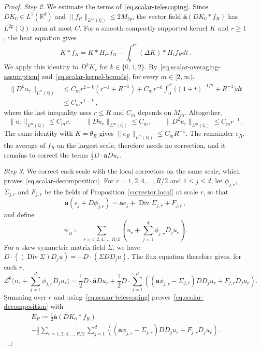 \documentclass[11pt]{amsart}
\theoremstyle{definition}
\theoremstyle{remark}
\numberwithin{equation}{section}
\newcommand{\Q}{\mathbb Q}
\newcommand{\R}{\mathbb R}
\renewcommand{\a}{\mathbf a}
\newcommand{\ahom}{\overline{\mathbf a}}
\newcommand{\Div}{\operatorname{Div}}
\begin{document}
\begin{proof}
\emph{Step 2.} We estimate the terms of~\eqref{eq.scalar-telescoping}. Since $DK_0\in L^1(\R^d)$ and $\|f_R\|_{L^{2p}(\Q)}\leq2M_{2p}$, the vector field $\ahom(DK_0*f_R)$ has $L^{2p}(\Q)$ norm at most $C$. For a smooth compactly supported kernel $K$ and $r\geq1$, the heat equation gives
\begin{equation}\label{eq.scalar-heat-transfer}
 K*f_R=K*H_{r^2}f_R-\int_0^{r^2}(\Delta K)*H_tf_Rdt\, .
\end{equation}
We apply this identity to $D^kK_r$ for $k\in\{0,1,2\}$. By~\eqref{eq.scalar-averaging-assumption} and~\eqref{eq.scalar-kernel-bounds}, for every $m\in[2,\infty)$,
\begin{align*}
 \|D^ku_r\|_{L^m(\Q)}
 &\leq C_mr^{2-k}(r^{-1}+R^{-1})
   +C_mr^{-k}\int_0^{r^2}\big((1+t)^{-1/2}+R^{-1}\big)dt\\
 &\leq C_mr^{1-k}\, ,
\end{align*}
where the last inequality uses $r\leq R$ and $C_m$ depends on $M_m$. Altogether,
\begin{equation}\label{eq.scalar-band-bounds}
 \|u_r\|_{L^m(\Q)}\leq C_mr,
 \qquad \|Du_r\|_{L^m(\Q)}\leq C_m,
 \qquad \|D^2u_r\|_{L^m(\Q)}\leq C_mr^{-1}\, .
\end{equation}
The same identity with $K=\theta_R$ gives $\|e_R\|_{L^m(\Q)}\leq C_mR^{-1}$. The remainder $e_R$, the average of $f_R$ on the largest scale, therefore needs no correction, and it remains to correct the terms $\frac12D\cdot\ahom Du_r$.

\emph{Step 3.} We correct each scale with the local correctors on the same scale, which proves~\eqref{eq.scalar-decomposition}. For $r=1,2,4,\ldots,R/2$ and $1\leq j\leq d$, let $\phi_{j,r}$, $\Sigma_{j,r}$ and $F_{j,r}$ be the fields of Proposition~\ref{corrector.local} at scale $r$, so that
\begin{equation*}
 \a(e_j+D\phi_{j,r})=\ahom e_j+\Div\Sigma_{j,r}+F_{j,r}\, ,
\end{equation*}
and define
\begin{equation}\label{eq.scalar-corrected-function}
 \psi_R\coloneqq\sum_{r=1,2,4,\ldots,R/2}
 \left(u_r+\sum_{j=1}^d\phi_{j,r}D_ju_r\right).
\end{equation}
For a skew-symmetric matrix field $\Sigma$, we have $D\cdot((\Div\Sigma)D_ju)=-D\cdot(\Sigma D D_ju)$. The flux equation therefore gives, for each $r$,
\begin{equation*}
 \mathcal L^0\Big(u_r+\sum_{j=1}^d\phi_{j,r}D_ju_r\Big)
 =\frac12D\cdot\ahom Du_r
 +\frac12D\cdot\sum_{j=1}^d\left((\a\phi_{j,r}-\Sigma_{j,r})D D_ju_r+F_{j,r}D_ju_r\right).
\end{equation*}
Summing over $r$ and using~\eqref{eq.scalar-telescoping} proves~\eqref{eq.scalar-decomposition} with
\begin{multline}\label{eq.scalar-E-explicit}
 E_R\coloneqq\frac12\ahom(DK_0*f_R)\\
 -\frac12\sum_{r=1,2,4,\ldots,R/2}\sum_{j=1}^d
 \left((\a\phi_{j,r}-\Sigma_{j,r})D D_ju_r+F_{j,r}D_ju_r\right).
\end{multline}


\end{proof}
\end{document}
